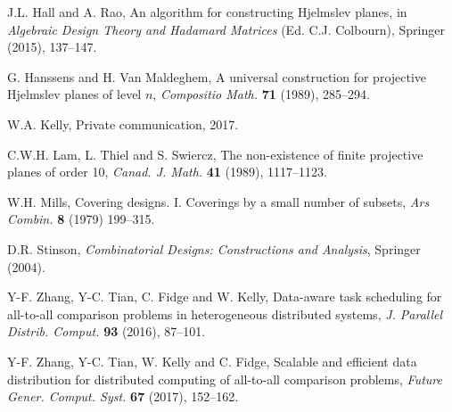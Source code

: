 \documentclass[11pt]{article}
\theoremstyle{definition}
\begin{document}
\begin{thebibliography}{10}
J.L. Hall and A. Rao, An algorithm for constructing Hjelmslev planes,
in \textit{Algebraic Design Theory and Hadamard Matrices} (Ed. C.J. Colbourn), Springer (2015), 137--147.

G. Hanssens and H. Van Maldeghem, A universal construction for projective Hjelmslev planes of level $n$,
\textit{Compositio Math.} \textbf{71} (1989), 285--294.

W.A. Kelly, Private communication, 2017.

C.W.H. Lam, L. Thiel and S. Swiercz, The non-existence of finite projective planes of order 10,
\textit{Canad. J. Math. } \textbf{41} (1989), 1117--1123.

W.H. Mills, Covering designs. I. Coverings by a small number of subsets,
\textit{Ars Combin.} \textbf{8} (1979) 199--315.

D.R. Stinson, \textit{Combinatorial Designs: Constructions and Analysis}, Springer (2004).

Y-F. Zhang, Y-C. Tian, C. Fidge and W. Kelly, Data-aware task scheduling for all-to-all comparison problems in heterogeneous distributed systems,
\textit{J. Parallel Distrib. Comput.} \textbf{93} (2016), 87--101.

Y-F. Zhang, Y-C. Tian, W. Kelly and C. Fidge, Scalable and efficient data distribution for distributed computing of all-to-all comparison problems,
\textit{Future Gener. Comput. Syst.} \textbf{67} (2017), 152--162.


\end{thebibliography}
\end{document}
